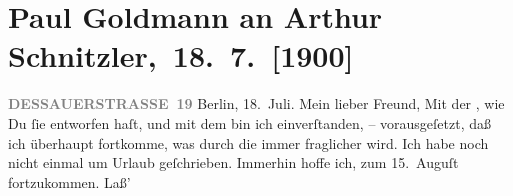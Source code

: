 

         
         \renewcommand{\erwaehntePersonen}{Personen: Georg Hirschfeld, Alfred Kerr}
         \renewcommand{\erwaehnteInstitutionen}{Institutionen: Berliner Theater, Schauspielhaus Berlin}
         \renewcommand{\erwaehnteOrte}{Orte: Berlin, China, Dessauer Straße, Innsbruck, Lago di Garda, Reichenau an der Rax, Riva del Garda}
         \renewcommand{\erwaehnteWerke}{Werke: Der Schleier der Beatrice. Schauspiel in fünf Akten}
               \section[ Paul Goldmann an Arthur Schnitzler, 18. 7. {[}1900{]}]{ Paul Goldmann an Arthur Schnitzler, 18. 7. {[}1900{]}}\nopagebreak{}\rehead{ }\begin{ledgroupsized}[t]{13cm}\normalsize\beginnumbering \toendnotes[C]{\smallbreak\pagebreak[2]} 
\toendnotes[C]{\smallbreak}\pstart
           \noindent{}\raggedleft{}{\pb}\textcolor{gray}{\textbf{DESSAUERSTRASSE 19}}\pend
           \pstart
           Berlin, 18. Juli.\pend
           \pstart\center{}Mein lieber Freund,\pend\pstart
           Mit der \label{K_L02924-1v}\label{K_L02924-1h}, wie Du ſie entworfen haſt, und mit dem \label{K_L02924-2v}\label{K_L02924-2h} bin ich einverſtanden, – vorausgeſetzt, daß ich überhaupt fortkomme, was
               durch die \label{K_L02924-3v}\label{K_L02924-3h} immer fraglicher wird. Ich habe noch nicht einmal um Urlaub geſchrieben.
               Immerhin hoffe ich, zum 15. Auguſt fortzukommen. Laß’

\end{ledgroupsized}
